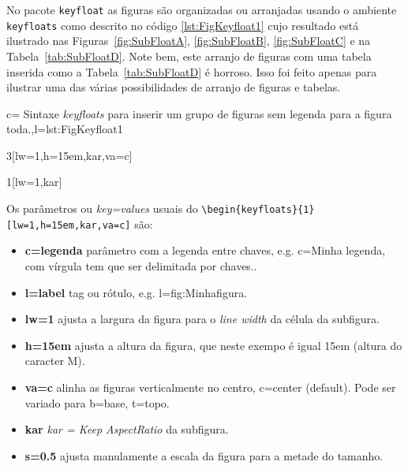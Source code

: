 No pacote \verb|keyfloat| as figuras são organizadas ou  arranjadas  usando  o ambiente \verb|keyfloats| como descrito no código \ref{lst:FigKeyfloat1} cujo resultado está ilustrado nas Figuras~\ref{fig:SubFloatA}, \ref{fig:SubFloatB}, \ref{fig:SubFloatC} e na Tabela~\ref{tab:SubFloatD}.  Note bem, este arranjo de figuras com uma tabela inserida como a Tabela~\ref{tab:SubFloatD} é horroso. Isso foi feito apenas para ilustrar uma das várias possibilidades de arranjo de figuras e tabelas.

\begin{keyfigure} {c= {Sintaxe \emph{keyfloats} para inserir um grupo de figuras sem legenda para a figura toda.},l=lst:FigKeyfloat1}
\lstset{language=[Latex]Tex}
\begin{highlightblock}
	\begin{keyfloats}{3}[lw=1,h=15em,kar,va=c]
		\begin{keyfloats}{1}[lw=1,kar]
		\end{keyfloats}
	\end{keyfloats}
\end{highlightblock}
\end{keyfigure}
Os parâmetros ou \emph{key=values} usuais do \verb|\begin{keyfloats}{1}[lw=1,h=15em,kar,va=c]| são:
	\begin{itemize}
		\item \textbf{c={legenda}} parâmetro com a legenda entre chaves, e.g. c={Minha legenda, com vírgula tem que ser delimitada por chaves.}.
		\item \textbf{l=label}  tag ou rótulo, e.g. l=fig:Minhafigura.
		\item \textbf{lw=1} ajusta a largura da figura para o \emph{line width} da célula da subfigura.
		\item \textbf{h=15em} ajusta a altura da figura, que neste exempo é igual 15em (altura do caracter M).
		\item \textbf{va=c} alinha as figuras verticalmente no centro, c=center (default). Pode ser variado para b=base, t=topo.
		\item \textbf{kar} \emph{kar = Keep AspectRatio} da subfigura.
		\item \textbf{s=0.5} ajusta manulamente a escala da figura para a metade do tamanho.
	\end{itemize}
	
